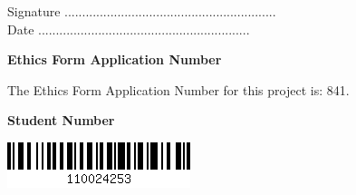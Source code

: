 \vspace{2em}
Signature ............................................................  \\

\vspace{1em}
Date ............................................................ \\

\vspace{3em}

\begin{center}
    {\LARGE\bf Ethics Form Application Number}
    
The Ethics Form Application Number for this project is: 841. 
\end{center}

\vspace{2em}

\begin{center}
    {\LARGE\bf Student Number}

\includegraphics[scale=0.6]{Images/clg11-barcode.png}
\end{center}


